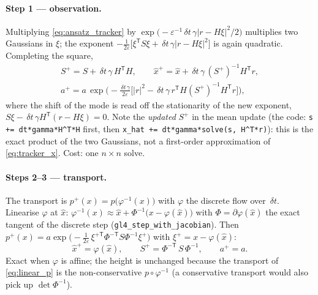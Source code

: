 \documentclass[11pt,a4paper]{article}
\newcommand{\T}{^{\mathsf T}}
\newcommand{\xh}{\hat{x}}
\newcommand{\eps}{\varepsilon}
\newcommand{\abs}[1]{\left\lvert #1 \right\rvert}
\newcommand{\dt}{\,\delta t}
\theoremstyle{plain}
\theoremstyle{definition}
\theoremstyle{remark}
\begin{document}
\paragraph{Step 1 --- observation.}
Multiplying \eqref{eq:ansatz_tracker} by $\exp\big(-\eps^{-1}\dt\,\gamma\abs{r-H\xi}^2/2\big)$ multiplies two Gaussians in $\xi$; the exponent $-\tfrac1{2\eps}\big[\xi\T S\xi + \dt\,\gamma\abs{r-H\xi}^2\big]$ is again quadratic. Completing the square,
\begin{equation}
\begin{gathered}
  S^+ = S + \dt\,\gamma\,H\T H, \qquad
  \xh^+ = \xh + \dt\,\gamma\,(S^+)^{-1}H\T r, \\
  a^+ = a\,\exp\Big(-\frac{\dt\,\gamma}{2\eps}\Big[\abs r^2 - \dt\,\gamma\, r\T H(S^+)^{-1}H\T r\Big]\Big),
\end{gathered}
  \label{eq:cycle_obs}
\end{equation}
where the shift of the mode is read off the stationarity of the new exponent, $S\xi - \dt\,\gamma H\T(r-H\xi) = 0$. Note the \emph{updated} $S^+$ in the mean update (the code: \texttt{s += dt*gamma*H\textasciicircum T*H} first, then \texttt{x\_hat += dt*gamma*solve(s, H\textasciicircum T*r)}): this is the exact product of the two Gaussians, not a first-order approximation of \eqref{eq:tracker_x}. Cost: one $n\times n$ solve.

\paragraph{Steps 2--3 --- transport.}
The transport is $p^+(x) = p\big(\varphi^{-1}(x)\big)$ with $\varphi$ the discrete flow over $\dt$. Linearise $\varphi$ at $\xh$: $\varphi^{-1}(x) \approx \xh + \Phi^{-1}\big(x - \varphi(\xh)\big)$ with $\Phi = \partial\varphi(\xh)$ the exact tangent of the discrete step (\texttt{gl4\_step\_with\_jacobian}). Then $p^+(x) = a\exp\big(-\tfrac1{2\eps}\,\xi^{+\mathsf T}\Phi^{-\mathsf T}S\Phi^{-1}\xi^+\big)$ with $\xi^+ = x-\varphi(\xh)$:
\begin{equation}
  \xh^+ = \varphi(\xh), \qquad S^+ = \Phi^{-\mathsf T}\,S\,\Phi^{-1}, \qquad a^+ = a .
  \label{eq:cycle_transport}
\end{equation}
Exact when $\varphi$ is affine; the height is unchanged because the transport of \eqref{eq:linear_p} is the non-conservative $p\circ\varphi^{-1}$ (a conservative transport would also pick up $\det\Phi^{-1}$).
\end{document}
